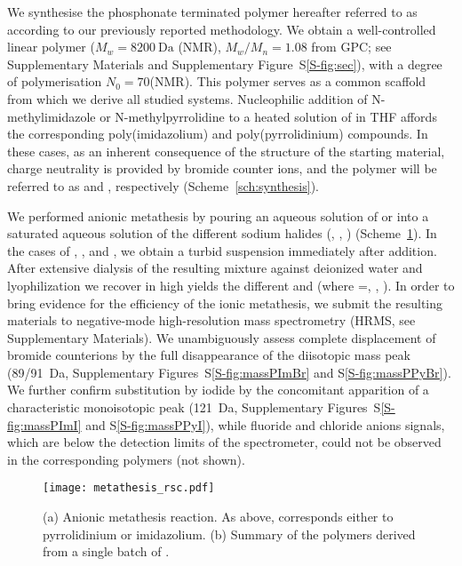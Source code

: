 \documentclass[twoside,twocolumn,9pt]{article}
\begin{document}
We synthesise the phosphonate terminated polymer hereafter referred to as  according to our previously reported methodology\cite{Srour2014,Appukuttan2012}. We obtain a well-controlled linear polymer ($M_w= \SI{8200}{\dalton}$ (NMR),  $M_w/M_n = 1.08$ from GPC; see Supplementary Materials and Supplementary Figure~S\ref{S-fig:sec}), with a degree of polymerisation $N_0=70$(NMR). This polymer serves as a common scaffold from which we derive  all studied systems. Nucleophilic addition of N-methylimidazole or N-methylpyrrolidine to a heated solution of  in THF affords the corresponding poly(imidazolium) and poly(pyrrolidinium) compounds. In these cases, as an inherent consequence of the structure of the starting material, charge neutrality is provided by bromide counter ions, and the polymer will be referred to as  and , respectively (Scheme~\ref{sch:synthesis}).



We performed anionic metathesis by pouring an aqueous solution of  or  into a saturated aqueous solution of the different sodium halides (, , ) (Scheme~\ref{sch:metathesis}). In the cases of ,  ,  and , we obtain a turbid suspension immediately after addition. After extensive dialysis of the resulting mixture against deionized water and lyophilization we recover in high yields the different  and  (where =, , ). In order to bring evidence for the efficiency of the ionic metathesis, we submit the resulting materials to negative-mode high-resolution mass spectrometry (HRMS, see Supplementary Materials). We unambiguously assess complete displacement of bromide counterions by the full disappearance of the diisotopic mass peak (89/\SI{91}{\dalton}, Supplementary Figures~S\ref{S-fig:massPImBr} and S\ref{S-fig:massPPyBr}). We further confirm substitution by iodide by the concomitant apparition of a characteristic monoisotopic peak (\SI{121}{\dalton}, Supplementary Figures~S\ref{S-fig:massPImI} and S\ref{S-fig:massPPyI}), while fluoride and chloride anions signals, which are below the detection limits of the spectrometer, could not be observed in the corresponding polymers (not shown).

\begin{figure}
\texttt{[image: metathesis\_rsc.pdf]}
\caption{(a) Anionic metathesis reaction. As above,  corresponds either to pyrrolidinium or imidazolium. (b) Summary of the polymers derived from a single batch of .}
\label{sch:metathesis}
\end{figure}
\end{document}
